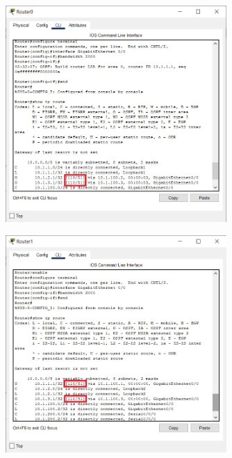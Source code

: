 \documentclass{article}
\begin{document}
\begin{figure}[H]
    \centering
    \includegraphics[width=0.75\textwidth]{figures/24.jpg}
    \caption{}
    \label{fig:fig1}
\end{figure}
\begin{figure}[H]
    \centering
    \includegraphics[width=0.75\textwidth]{figures/25.jpg}
    \caption{}
    \label{fig:fig1}
\end{figure}
\end{document}
